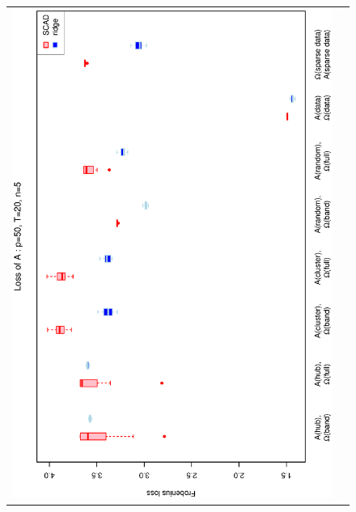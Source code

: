 \documentclass[a4paper]{article}
\begin{document}
\begin{figure}[h!]
\centering
\begin{tabular}{cc}
\includegraphics[scale=0.5,angle=270]{LossA50T20N5.eps}\\

\end{tabular}
\end{figure}
\end{document}
